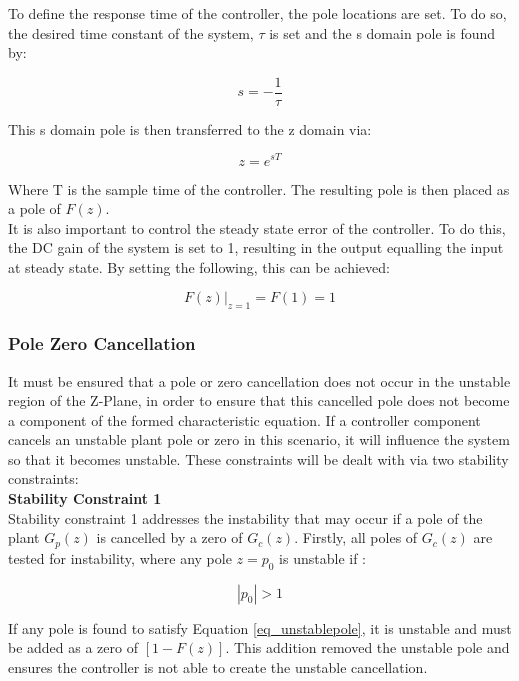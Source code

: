 To define the response time of the controller, the pole locations are set. To do so, the desired time constant of the system, $\tau$ is set and the s domain pole is found by:

\begin{equation}
s = -\frac{1}{\tau}
\end{equation}

This s domain pole is then transferred to the z domain via:

\begin{equation}
z = e^{sT}
\end{equation}

Where T is the sample time of the controller. The resulting pole is then placed as a pole of $F(z)$.\\

It is also important to control the steady state error of the controller. To do this, the DC gain of the system is set to 1, resulting in the output equalling the input at steady state. By setting the following, this can be achieved:

\begin{equation}
F(z)|_{z=1} = F(1) = 1
\end{equation}

\subsubsection{Pole Zero Cancellation}

It must be ensured that a pole or zero cancellation does not occur in the unstable region of the Z-Plane, in order to ensure that this cancelled pole does not become a component of the formed characteristic equation. If a controller component cancels an unstable plant pole or zero in this scenario, it will influence the system so that it becomes unstable. These constraints will be dealt with via two stability constraints:\\

\textbf{Stability Constraint 1}\\
Stability constraint 1 addresses the instability that may occur if a pole of the plant $G_p(z)$ is cancelled by a zero of $G_c(z)$. Firstly, all poles of $G_c(z)$ are tested for instability, where any pole $z = p_0$ is unstable if :

\begin{equation}
\label{eq_unstablepole}
|p_0| > 1
\end{equation}

If any pole is found to satisfy Equation \ref{eq_unstablepole}, it is unstable and must be added as a zero of $[1 - F(z)]$. This addition removed the unstable pole and ensures the controller is not able to create the unstable cancellation.\\

